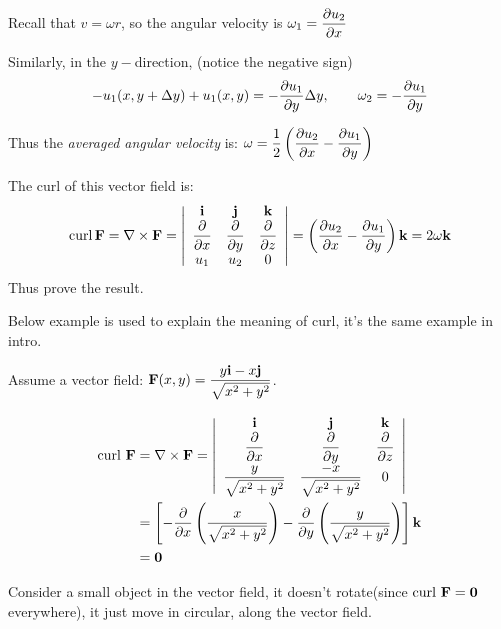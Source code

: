 \begin{spacing}{1.3}
\begin{center}
    \end{center}
    Recall that $v=\omega r$, so the angular velocity is $\omega_1 = \dfrac{\partial u_2}{\partial x}$

    Similarly, in the $y-$direction, (notice the negative sign)
    $$-u_1(x,y+\Delta y)+u_1(x,y)=-\dfrac{\partial u_1}{\partial y}\Delta y,\qquad 
    \omega_2 = -\dfrac{\partial u_1}{\partial y}$$

    Thus the {\it averaged angular velocity} is: $\displaystyle \omega = \frac{1}{2} 
    \left(\frac{\partial u_2}{\partial x} - \frac{\partial u_1}{\partial y}\right)$

    The curl of this vector field is: 
    $$
    \operatorname{curl} \mathbf{F}=\nabla \times \mathbf{F}=\left|\begin{array}{ccc}
    \mathbf{i} & \mathbf{j} & \mathbf{k} \\
    \dfrac{\partial}{\partial x} & \dfrac{\partial}{\partial y} & \dfrac{\partial}{\partial z} \\
    u_1 & u_2 & 0
    \end{array}\right|= \left(\frac{\partial u_2}{\partial x} - \frac{\partial u_1}{\partial y}\right){\bf k} =2\omega {\bf k}
    $$
    Thus prove the result.


    \vspace{0.5in}
    {\blue Below example is used to explain the meaning of curl, it's the same example in intro.}

    \eg Assume a vector field: ${\bf F}(x,y)=\dfrac{y{\bf i} -x{\bf j}}{\sqrt{x^2+y^2}}$.

    \sol
    \begin{align*}
        {{\rm curl\ }{\bf F}} &= \nabla \times {\bf F} = \left|\begin{array}{ccc}
            {\bf i} & {\bf j} & {\bf k} \\ \dfrac{\partial}{\partial x} & \dfrac{\partial}{\partial y} & \dfrac{\partial}{\partial z} \\
            \dfrac{y}{\sqrt{x^2+y^2}} & \dfrac{-x}{\sqrt{x^2+y^2}} & 0
        \end{array} \right|\\
        &= \left[ -\dfrac{\partial}{\partial x}\left( \dfrac{x}{\sqrt{x^2+y^2}} \right)
                -\dfrac{\partial}{\partial y}\left( \dfrac{y}{\sqrt{x^2+y^2}}\right) \right] {\bf k} \\
        &= {\bf 0}   
    \end{align*}

    Consider a small object in the vector field, it doesn't rotate(since ${\rm curl\ } {\bf F}={\bf 0}$ everywhere),
    it just move in circular, along the vector field.


\end{spacing}

